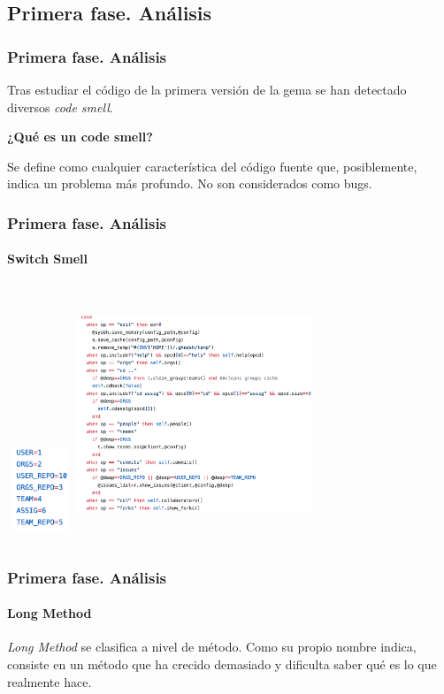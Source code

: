 \documentclass{beamer}
\begin{document}
\subsection{Primera fase. Análisis}
\begin{frame}[fragile]
\frametitle{Primera fase. Análisis}
  Tras estudiar el código de la primera versión de la gema se han detectado diversos {\it code smell}.
  \bigskip

  \textbf{¿Qué es un code smell?}
  \bigskip

  Se define como cualquier característica del código fuente que, posiblemente, 
  indica un problema más profundo. No son considerados como bugs.
\end{frame}

\begin{frame}
\frametitle{Primera fase. Análisis}
\framesubtitle{Switch Smell}

  \begin{columns}
      \includegraphics[height=2.5cm, width=2cm]{img/constantes.png}
    \includegraphics[height=7cm, width=7cm]{img/switch-smell.png}
  \end{columns}

\end{frame}

\begin{frame}
  \frametitle{Primera fase. Análisis}
  \framesubtitle{Long Method}
  {\it Long Method} se clasifica a nivel de método. Como su propio nombre indica,
  consiste en un método que ha crecido demasiado y dificulta saber qué es lo que realmente hace.
\end{frame}
\end{document}
